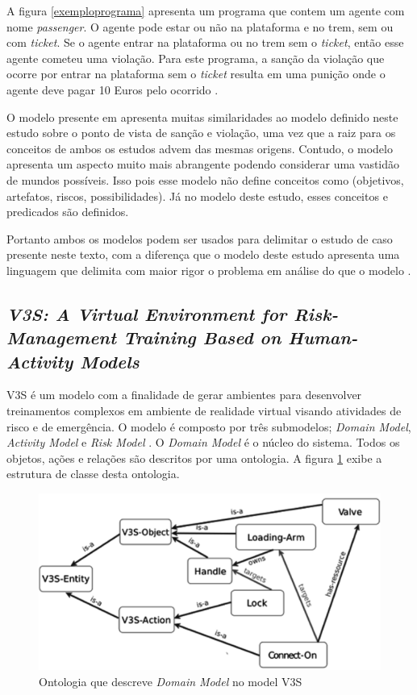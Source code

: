 \documentclass[12pt]{article}
\begin{document}
A figura \ref{exemploprograma} apresenta um programa que contem um agente com nome \textit{passenger}. O agente pode estar ou não na plataforma e no trem, sem ou com \textit{ticket}. Se o agente entrar na plataforma ou no trem sem o \textit{ticket}, então esse agente cometeu uma violação. Para este programa, a sanção da violação que ocorre por entrar na plataforma sem o \textit{ticket} resulta em uma punição onde o agente deve pagar 10 Euros pelo ocorrido \cite{dastaniNormativeMultiAgentProgram}.

O modelo presente em \cite{dastaniNormativeMultiAgentProgram} apresenta muitas similaridades ao modelo definido neste estudo sobre o ponto de vista de sanção e violação, uma vez que a raiz para os conceitos de ambos os estudos advem das mesmas origens. Contudo, o modelo \cite{dastaniNormativeMultiAgentProgram} apresenta um aspecto muito mais abrangente podendo considerar uma vastidão de mundos possíveis. Isso pois esse modelo não define conceitos como (objetivos, artefatos, riscos, possibilidades). Já no modelo deste estudo, esses conceitos e predicados são definidos.

Portanto ambos os modelos podem ser usados para delimitar o estudo de caso presente neste texto, com a diferença que o modelo deste estudo apresenta uma linguagem que delimita com maior rigor o problema em análise do que o modelo \cite{dastaniNormativeMultiAgentProgram}.

\subsection{\textit{V3S: A Virtual Environment for Risk-Management Training Based on Human-Activity Models}}

V3S é um modelo com a finalidade de gerar ambientes para desenvolver treinamentos complexos em ambiente de realidade virtual visando atividades de risco e de emergência. O modelo é composto por três submodelos; \textit{Domain Model}, \textit{Activity Model} e \textit{Risk Model} \cite{violationcamille}. O \textit{Domain Model} é o núcleo do sistema. Todos os objetos, ações e relações são descritos por uma ontologia. A figura \ref{domainmodel} exibe a estrutura de classe desta ontologia.

\begin{figure}[H]
  \centering
  \includegraphics[width=0.5\linewidth]{ontologyv3.png} 
  \caption{Ontologia que descreve \textit{Domain Model} no model V3S \cite{violationcamille}}
  \label{domainmodel}
\end{figure}
\end{document}
